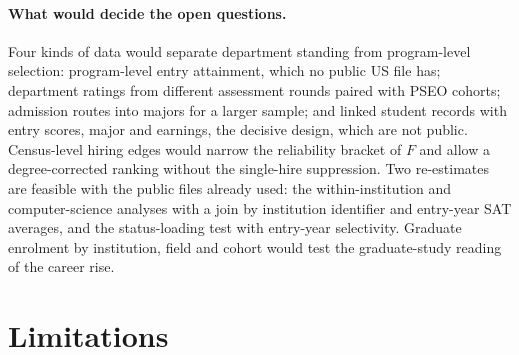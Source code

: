 \documentclass[11pt]{article}
\begin{document}
\paragraph{What would decide the open questions.} Four kinds of data would separate department standing from
program-level selection: program-level entry attainment, which no public US file has; department ratings from
different assessment rounds \citep{nrc1995research, nrc2011data} paired with PSEO cohorts; admission routes into
majors for a larger sample; and linked student records with entry scores, major and earnings, the decisive
design, which are not public. Census-level hiring edges would narrow the reliability bracket of $F$ and allow a
degree-corrected ranking without the single-hire suppression. Two re-estimates are feasible with the public files
already used: the within-institution and computer-science analyses with a join by institution identifier and
entry-year SAT averages, and the status-loading test with entry-year selectivity. Graduate enrolment by
institution, field and cohort would test the graduate-study reading of the career rise.

\section{Limitations}\label{sec:limits}
\end{document}
